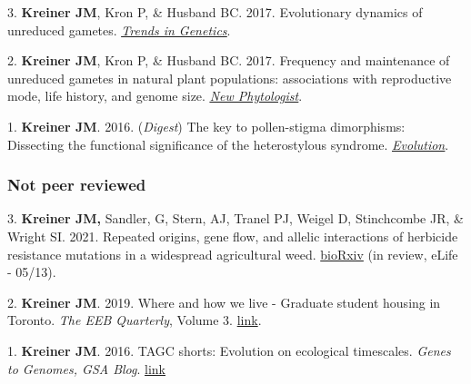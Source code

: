 \documentclass[12pt]{article}
\begin{document}
\medskip

\noindent\hspace{.1cm}3. \textbf{Kreiner JM}, Kron P, \& Husband BC. 2017. Evolutionary dynamics of unreduced gametes. \href{https://doi.org/10.1016/j.tig.2017.06.009} {\underline{\textit{Trends in Genetics}}}.

\medskip

\noindent\hspace{.1cm}2. \textbf{Kreiner JM}, Kron P, \& Husband BC. 2017. Frequency and maintenance of unreduced gametes in natural plant populations: associations with reproductive mode, life history, and genome size. \href{https://nph.onlinelibrary.wiley.com/doi/full/10.1111/nph.14423}{\underline{\textit{New Phytologist}}}.
\medskip

\noindent\hspace{.1cm}1. \textbf{Kreiner JM}.  2016. (\textit{Digest}) The key to pollen-stigma dimorphisms: Dissecting the functional significance of the heterostylous syndrome. \href{https://doi.org/10.1111/evo.13123}{\underline{\textit{Evolution}}}.

\subsubsection*{Not peer reviewed}

\noindent\hspace{.1cm}3. \textbf{Kreiner JM,} Sandler, G, Stern, AJ, Tranel PJ, Weigel D, Stinchcombe JR, \& Wright SI. 2021. Repeated origins, gene flow, and allelic interactions of herbicide resistance mutations in a widespread agricultural weed. \href{https://doi.org/10.1101/2021.05.10.443516}{bioRxiv} (in review, eLife - 05/13). 

\noindent\hspace{.1cm}2. \textbf{Kreiner JM}. 2019. Where and how we live - Graduate student housing in Toronto. \textit{The EEB Quarterly}, Volume 3. \href{https://theeebquarterly.github.io/}{link}.


\noindent\hspace{.1cm}1. \textbf{Kreiner JM}. 2016. TAGC shorts: Evolution on ecological timescales. \textit{Genes to Genomes, GSA Blog}. \href{http://genestogenomes.org/tagc16-shorts-evolution-on-ecological-timescales/}{link}
\end{document}
